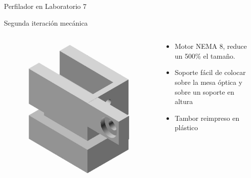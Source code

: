 \begin{frame}{Perfilador en Laboratorio 7}
\begin{onlyenv}
    Segunda iteración mecánica
    \begin{columns}[c]
        \begin{column}{0.4\textwidth}
            \begin{figure}
                \centering
                \includegraphics[width=\textwidth]{fig/perfilador/soporte_labo7_2}
             
                \label{fig:soporte_labo7}
            \end{figure}
        \end{column}
        \begin{column}{0.5\textwidth}
            \begin{itemize}
                \item  Motor NEMA 8, reduce un 500\% el tamaño.
                \item  Soporte fácil de colocar sobre la mesa óptica y sobre un soporte en altura
                \item  Tambor reimpreso en plástico
            \end{itemize}
            
        \end{column}
    \end{columns}
    \end{onlyenv}
\end{frame}



